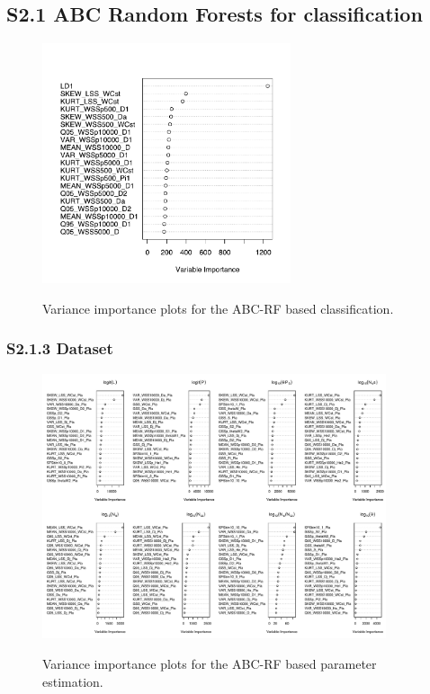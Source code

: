 \documentclass[12pt]{article}
\begin{document}
\newpage
\subsection*{S2.1 ABC Random Forests for classification}
\begin{figure}[ht]
  \centering
  \includegraphics[width=0.65\textwidth]{Figures/varImportance_class.pdf}
  \label{fig:figS5}
  \caption{Variance importance plots for the ABC-RF based classification.}
\end{figure}

\subsubsection*{S2.1.3 Dataset}
\begin{figure}[ht]
  \centering
  \includegraphics[width=0.9\textwidth]{Figures/varimportance_plots_placerita.pdf}
  \label{fig:figS6}
  \caption{Variance importance plots for the ABC-RF based parameter estimation.}
\end{figure}
\end{document}
